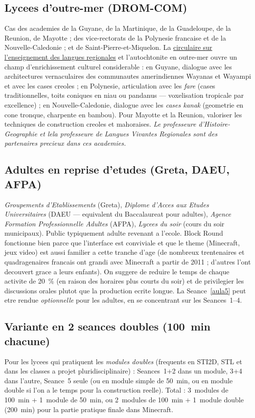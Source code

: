 \documentclass[12pt,a4paper]{scrartcl}
\begin{document}
\subsection{Lycees d'outre-mer (DROM-COM)}
Cas des academies de la Guyane, de la Martinique, de la Guadeloupe, de la Reunion, de Mayotte ; des vice-rectorats de la Polynesie francaise et de la Nouvelle-Caledonie ; et de Saint-Pierre-et-Miquelon. La \href{https://www.education.gouv.fr/}{circulaire sur l'enseignement des langues regionales} et l'autochtonite en outre-mer ouvre un champ d'enrichissement culturel considerable : en Guyane, dialogue avec les architectures vernaculaires des communautes amerindiennes Wayanas et Wayampi et avec les cases creoles ; en Polynesie, articulation avec les \emph{fare} (cases traditionnelles, toits coniques en niau ou pandanus --- voxelisation tropicale par excellence) ; en Nouvelle-Caledonie, dialogue avec les \emph{cases kanak} (geometrie en cone tronque, charpente en bambou). Pour Mayotte et la Reunion, valoriser les techniques de construction creoles et mahoraises. \emph{Le professeur\textperiodcentered e d'Histoire-Geographie et le\textperiodcentered la professeur\textperiodcentered e de Langues Vivantes Regionales sont des partenaires precieux dans ces academies.}

\subsection{Adultes en reprise d'etudes (Greta, DAEU, AFPA)}
\emph{Groupements d'Etablissements} (Greta), \emph{Diplome d'Acces aux Etudes Universitaires} (DAEU --- equivalent du Baccalaureat pour adultes), \emph{Agence Formation Professionnelle Adultes} (AFPA), \emph{Lycees du soir} (cours du soir municipaux). Public typiquement adulte revenant a l'ecole. Block Round fonctionne bien parce que l'interface est conviviale et que le theme (Minecraft, jeux video) est aussi familier a cette tranche d'age (de nombreux trentenaires et quadragenaires francais ont grandi avec Minecraft a partir de 2011 ; d'autres l'ont decouvert grace a leurs enfants). On suggere de reduire le temps de chaque activite de 20~\% (en raison des horaires plus courts du soir) et de privilegier les discussions orales plutot que la production ecrite longue. La Seance~\ref{aula5} peut etre rendue \emph{optionnelle} pour les adultes, en se concentrant sur les Seances~1--4.

\subsection{Variante en 2 seances doubles (100~min chacune)}
Pour les lycees qui pratiquent les \emph{modules doubles} (frequents en STI2D, STL et dans les classes a projet pluridisciplinaire) : Seances~1+2 dans un module, 3+4 dans l'autre, Seance~5 seule (ou en module simple de 50~min, ou en module double si l'on a le temps pour la construction reelle). Total : 3~modules de 100~min + 1~module de 50~min, ou 2~modules de 100~min + 1~module double (200~min) pour la partie pratique finale dans Minecraft.
\end{document}
